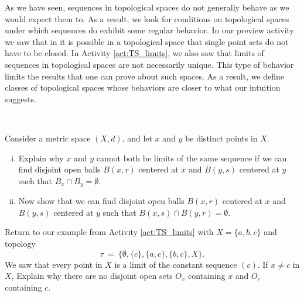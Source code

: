 \label{sec_separation_ax}

As we have seen, sequences in topological spaces do not generally behave as we would expect them to. As a result, we look for conditions on topological spaces under which sequences do exhibit some regular behavior. In our preview activity we saw that in it is possible in a topological space that single point sets do not have to be closed. In Activity \ref{act:TS_limits}, we also saw that limits of sequences in topological spaces are not necessarily unique. This type of behavior limits the results that one can prove about such spaces. As a result, we define classes of topological spaces whose behaviors are closer to what our intuition suggests. 

\begin{activity} \label{act:Hausdorff} ~
\ba
\item Consider a metric space $(X,d)$, and let $x$ and $y$ be distinct points in $X$. 
	\begin{enumerate}[i.]
	\item Explain why $x$ and $y$ cannot both be limits of the same sequence if we can find disjoint open balls $B(x,r)$ centered at $x$ and $B(y,s)$ centered at $y$ such that $B_x \cap B_y = \emptyset$.
	
	\item Now show that we can find disjoint open balls $B(x,r)$ centered at $x$ and $B(y,s)$ centered at $y$ such that $B(x,s) \cap B(y,r) = \emptyset$.
	
	\end{enumerate}

\item Return to our example from Activity \ref{act:TS_limits} with $X = \{a, b, c\}$ and topology 
\[\tau~=~\{\emptyset, \{c\}, \{a, c\}, \{b, c\}, X\}.\] 
We saw that every point in $X$ is a limit of the constant sequence $(c)$. If $x \neq c$ in $X$, Explain why there are no disjoint open sets $O_x$ containing $x$ and $O_c$ containing $c$. 	

\ea

\end{activity}

